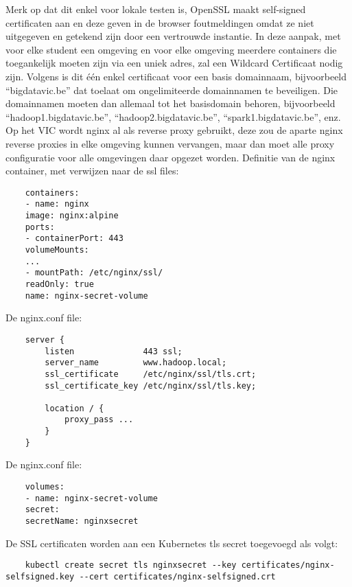 Merk op dat dit enkel voor lokale testen is, OpenSSL maakt self-signed certificaten aan en deze geven in de browser foutmeldingen omdat ze niet uitgegeven en getekend zijn door een vertrouwde instantie.
\newline
In deze aanpak, met voor elke student een omgeving en voor elke omgeving meerdere containers die toegankelijk moeten zijn via een uniek adres, zal een Wildcard Certificaat nodig zijn. \sloppypar Volgens \textcite{Digicert2023} is dit één enkel certificaat voor een basis domainnaam, bijvoorbeeld ``bigdatavic.be'' dat toelaat om ongelimiteerde domainnamen te beveiligen. Die domainnamen moeten dan allemaal tot het basisdomain behoren, bijvoorbeeld ``hadoop1.bigdatavic.be'', ``hadoop2.bigdatavic.be'', ``spark1.bigdatavic.be'', enz.
\newline
Op het VIC wordt nginx al als reverse proxy gebruikt, deze zou de aparte nginx reverse proxies in elke omgeving kunnen vervangen, maar dan moet alle proxy configuratie voor alle omgevingen daar opgezet worden.
\newline
\newline
Definitie van de nginx container, met verwijzen naar de ssl files:
\begin{lstlisting}
    containers:
    - name: nginx
    image: nginx:alpine
    ports:
    - containerPort: 443
    volumeMounts:
    ...
    - mountPath: /etc/nginx/ssl/
    readOnly: true
    name: nginx-secret-volume
\end{lstlisting}

De nginx.conf file:
\begin{lstlisting}
    server {
        listen              443 ssl;
        server_name         www.hadoop.local;
        ssl_certificate     /etc/nginx/ssl/tls.crt;
        ssl_certificate_key /etc/nginx/ssl/tls.key;
        
        location / {
            proxy_pass ...
        }
    }
\end{lstlisting}

De nginx.conf file:
\begin{lstlisting}
    volumes:
    - name: nginx-secret-volume
    secret:
    secretName: nginxsecret
\end{lstlisting}


De SSL certificaten worden aan een Kubernetes tls secret toegevoegd als volgt:
\begin{lstlisting}
    kubectl create secret tls nginxsecret --key certificates/nginx-selfsigned.key --cert certificates/nginx-selfsigned.crt
\end{lstlisting}

